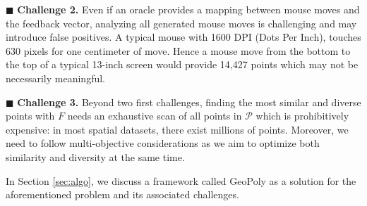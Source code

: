 \vspace{2pt}
\noindent $\blacksquare$ {\bf Challenge 2.} Even if an oracle provides a mapping between mouse moves and the feedback vector, analyzing all generated mouse moves is challenging and may introduce false positives. A typical mouse with 1600 DPI (Dots Per Inch), touches 630 pixels for one centimeter of move. Hence a mouse move from the bottom to the top of a typical 13-inch screen would provide 14,427 points which may not be necessarily meaningful.

\vspace{3pt}
\noindent $\blacksquare$ {\bf Challenge 3.} Beyond two first challenges, finding the most similar and diverse points with $F$ needs an exhaustive scan of all points in $\mathcal{P}$ which is prohibitively expensive: in most spatial datasets, there exist millions of points. Moreover, we need to follow multi-objective considerations as we aim to optimize both similarity and diversity at the same time.

\vspace{2pt}
In Section \ref{sec:algo}, we discuss a framework called {\sc GeoPoly} as a solution for the aforementioned problem and its associated challenges.